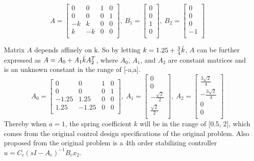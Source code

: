\documentclass{article}[12pt]
\begin{document}
\begin{equation*}
    A = 
    \begin{bmatrix}
    0 & 0 & 1 & 0 \\
    0 & 0 & 0 & 1 \\
    -k & k & 0 & 0 \\
    k & -k & 0 & 0 \\
    \end{bmatrix}, \:
     B_1 = 
    \begin{bmatrix}
    0  \\
    0  \\
    1 \\
    0 \\
    \end{bmatrix}, \:
     B_2 = 
    \begin{bmatrix}
    0  \\
    0  \\
    0 \\
    -1 \\
    \end{bmatrix}
\end{equation*}

Matrix $A$ depends affinely on k. So by letting $k= 1.25 + \frac{3}{4}\Bar{k}$, $A$ can be further expressed as $A = A_0 + A_1 \Bar{k} A_2^T$, where $A_0$, $A_1$, and $A_2$ are constant matrices and  is an unknown constant in the range of [-a,a].
\begin{equation*}
    A_0= 
    \begin{bmatrix}
    0 & 0 & 1 & 0 \\
    0 & 0 & 0 & 1 \\
    -1.25 & 1.25 & 0 & 0 \\
    1.25 & -1.25 & 0 & 0 \\
    \end{bmatrix}, \:
    A_1 = 
    \begin{bmatrix}
    0  \\
    0  \\
    -\frac{\sqrt{2}}{2} \\
    \frac{\sqrt{2}}{2} \\
    \end{bmatrix}, \:
     A_2 = 
    \begin{bmatrix}
    \frac{3\sqrt{2}}{4}  \\
    -\frac{3\sqrt{2}}{4} \\
    0 \\
    0 \\
    \end{bmatrix}
\end{equation*}
Thereby when $a=1$, the spring coefficient $k$ will be in the range of [0.5, 2], which comes from the original control design specifications of the original problem. Also proposed from the original problem is a 4th order stabilizing controller $u = C_c(sI-A_c)^{-1}B_cx_2$.
\end{document}
